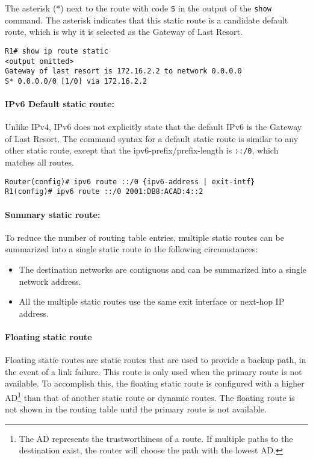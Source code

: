 \note The asterisk (*) next to the route with code \verb|S| in the output of the \verb|show| command. The asterisk indicates that this static route is a candidate default route, which is why it is selected as the Gateway of Last Resort.

\begin{verbatim}
R1# show ip route static
<output omitted>
Gateway of last resort is 172.16.2.2 to network 0.0.0.0
S* 0.0.0.0/0 [1/0] via 172.16.2.2
\end{verbatim}

\paragraph{IPv6 Default static route:} Unlike IPv4, IPv6 does not explicitly state that the default IPv6 is the Gateway of Last Resort. The command syntax for a default static route is similar to any other static route, except that the ipv6-prefix/prefix-length is \verb|::/0|, which matches all routes.

\begin{verbatim}
Router(config)# ipv6 route ::/0 {ipv6-address | exit-intf}
R1(config)# ipv6 route ::/0 2001:DB8:ACAD:4::2
\end{verbatim}

\paragraph{Summary static route:} To reduce the number of routing table entries, multiple static routes can be summarized into a single static route in the following circumstances:

\begin{itemize}
\item The destination networks are contiguous and can be summarized into a single network address.
\item All the multiple static routes use the same exit interface or next-hop IP address.
\end{itemize}

\paragraph{Floating static route}

Floating static routes are static routes that are used to provide a backup path, in the event of a link failure. This route is only used when the primary route is not available. To accomplish this, the floating static route is configured with a higher AD\footnote{The AD represents the trustworthiness of a route. If multiple paths to the destination exist, the router will choose the path with the lowest AD.} than that of another static route or dynamic routes. The floating route is not shown in the routing table until the primary route is not available.

